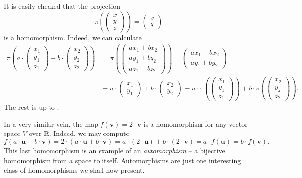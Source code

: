 It is easily checked that the projection
\[
 \pi \left( 
  \begin{pmatrix}
   x\\
   y\\
   z
  \end{pmatrix}
 \right) = 
 \begin{pmatrix}
  x\\
  y
 \end{pmatrix}
\]
is a homomorphism. Indeed, we can calculate
\begin{align*}
 \pi \left( a \cdot 
 \begin{pmatrix}
  x_1\\
  y_1\\
  z_1
 \end{pmatrix} + b \cdot 
 \begin{pmatrix}
  x_2\\
  y_2\\
  z_2
 \end{pmatrix}
\right) &= 
 \pi \left( 
 \begin{pmatrix}
  ax_1 + bx_2\\
  ay_1 + by_2\\
  az_1 + bz_2
 \end{pmatrix}
 \right) = 
 \begin{pmatrix}
  ax_1 + bx_2\\
  ay_1 + by_2
 \end{pmatrix}
 \\
        &=a \cdot 
 \begin{pmatrix}
  x_1\\
  y_1
 \end{pmatrix}
 + b \cdot 
 \begin{pmatrix}
  x_2\\
  y_2
 \end{pmatrix} = 
 a \cdot \pi
 \left( 
 \begin{pmatrix}
  x_1\\
  y_1\\
  z_1
 \end{pmatrix}
 \right) + b \cdot \pi \left( 
 \begin{pmatrix}
  x_2\\
  y_2\\
  z_2
 \end{pmatrix}
 \right).
\end{align*}
The rest is up to .

In a very similar vein, the map $f(\mathbf{v}) = 2 \cdot \mathbf{v}$ is a
homomorphism for any vector space $V$ over $\mathbb{R}$. Indeed, we may compute
\[
 f(a \cdot \mathbf{u} + b \cdot \mathbf{v}) = 2 \cdot (a \cdot \mathbf{u} + b
 \cdot \mathbf{v}) = a \cdot (2 \cdot \mathbf{u}) + b \cdot (2 \cdot \mathbf{v})
 = a \cdot f(\mathbf{u}) = b \cdot f(\mathbf{v}).
\]
This last homomorphism is an example of an \emph{automorphism} -- a bijective
homomorphism from a space to itself. Automorphisms are just one interesting
class of homomorphisms we shall now present.

